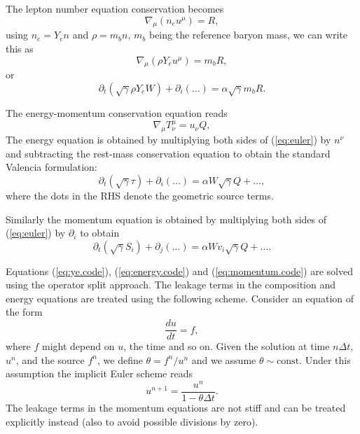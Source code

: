 The lepton number equation conservation becomes
\begin{equation}
 \nabla_{\mu} (n_e u^\mu) = R,
\end{equation}
using $n_e = Y_e n$ and $\rho = m_b n$, $m_b$ being the reference baryon mass,
we can write this as
\begin{equation}\label{eq:ye.cons}
  \nabla_{\mu} (\rho Y_e u^\mu) = m_b R,
\end{equation}
or
\begin{equation}\label{eq:ye.code}
  \partial_t (\sqrt{\gamma}\rho Y_e W) +  \partial_i (\ldots) =
    \alpha \sqrt{\gamma} m_b R.
\end{equation}

The energy-momentum conservation equation reads
\begin{equation}\label{eq:euler}
  \nabla_\mu T^{\mu}_{\nu} = u_\nu Q,
\end{equation}
The energy equation is obtained by multiplying both sides of (\ref{eq:euler}) by
$n^\nu$ and subtracting the rest-mass conservation equation to obtain the
standard Valencia formulation:
\begin{equation}\label{eq:energy.code}
  \partial_t (\sqrt{\gamma} \tau) + \partial_i (\ldots) = \alpha W \sqrt{\gamma}
  Q + \ldots,
\end{equation}
where the dots in the RHS denote the geometric source terms.

Similarly the momentum equation is obtained by multiplying both sides of
(\ref{eq:euler}) by $\partial_i$ to obtain
\begin{equation}\label{eq:momentum.code}
  \partial_t (\sqrt{\gamma} S_i) + \partial_j (\ldots) = \alpha W v_i
  \sqrt{\gamma} Q + \ldots.
\end{equation}

Equations (\ref{eq:ye.code}), (\ref{eq:energy.code}) and
(\ref{eq:momentum.code}) are solved using the operator split approach. The
leakage terms in the composition and energy equations are treated using the
following scheme. Consider an equation of the form
\begin{equation}
  \frac{du}{dt} = f,
\end{equation}
where $f$ might depend on $u$, the time and so on. Given the solution at time $n
\Delta t$, $u^n$, and the source $f^n$, we define $\theta = f^n / u^n$ and we
assume $\theta \sim \mathrm{const}$. Under this assumption the implicit Euler
scheme reads
\begin{equation}
  u^{n+1} = \frac{u^n}{1 - \theta \Delta t}.
\end{equation}
The leakage terms in the momentum equations are not stiff and can be treated
explicitly instead (also to avoid possible divisions by zero).

